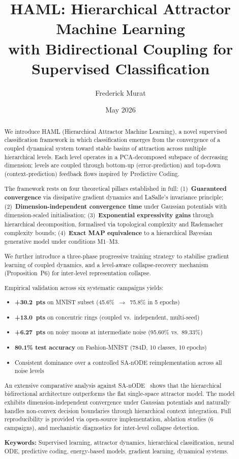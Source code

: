 \documentclass[11pt,a4paper]{article}
\title{HAML: Hierarchical Attractor Machine Learning\\
with Bidirectional Coupling for Supervised Classification}
\author{Frederick Murat}
\affil{Independent Researcher}
\date{May 2026}
\begin{document}
\maketitle

\begin{abstract}
We introduce HAML (Hierarchical Attractor Machine Learning), a novel supervised classification
framework in which classification emerges from the convergence of a coupled dynamical system toward
stable basins of attraction across multiple hierarchical levels. Each level operates in a
PCA-decomposed subspace of decreasing dimension; levels are coupled through bottom-up
(error-prediction) and top-down (context-prediction) feedback flows inspired by Predictive Coding.

The framework rests on four theoretical pillars established in full:
(1)~\textbf{Guaranteed convergence} via dissipative gradient dynamics and LaSalle's invariance
principle;
(2)~\textbf{Dimension-independent convergence time} under Gaussian potentials with
dimension-scaled initialisation;
(3)~\textbf{Exponential expressivity gains} through hierarchical decomposition, formalised via
topological complexity and Rademacher complexity bounds;
(4)~\textbf{Exact MAP equivalence} to a hierarchical Bayesian generative model under conditions
M1--M3.

We further introduce a three-phase progressive training strategy to stabilise gradient learning of
coupled dynamics, and a level-aware collapse-recovery mechanism (Proposition~P6) for inter-level
representation collapse.

Empirical validation across six systematic campaigns yields:
\begin{itemize}
  \item \textbf{+30.2~pts} on MNIST subset (45.6\%~$\to$~75.8\% in 5 epochs)
  \item \textbf{+13.0~pts} on concentric rings (coupled vs.\ independent, multi-seed)
  \item \textbf{+6.27~pts} on noisy moons at intermediate noise (95.60\% vs.\ 89.33\%)
  \item \textbf{80.1\% test accuracy} on Fashion-MNIST (784D, 10 classes, 10 epochs)
  \item Consistent dominance over a controlled SA-nODE reimplementation across all noise levels
\end{itemize}

An extensive comparative analysis against SA-nODE~\cite{marino2024} shows that the hierarchical
bidirectional architecture outperforms the flat single-space attractor model.  The model exhibits
dimension-independent convergence under Gaussian potentials and naturally handles non-convex
decision boundaries through hierarchical context integration.  Full reproducibility is provided
via open-source implementation, ablation studies (6 campaigns), and mechanistic diagnostics for
inter-level collapse detection.

\textbf{Keywords:} Supervised learning, attractor dynamics, hierarchical classification, neural
ODE, predictive coding, energy-based models, gradient learning, dynamical systems.
\end{abstract}
\end{document}
